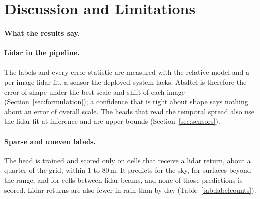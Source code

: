 %
\section{Discussion and Limitations}
\label{sec:discussion}

\paragraph{What the results say.} 

\paragraph{Lidar in the pipeline.} The labels and every error statistic are measured with the relative model and a per-image lidar fit, a sensor the deployed system lacks. AbsRel is therefore the error of shape under the best scale and shift of each image (Section~\ref{sec:formulation}); a confidence that is right about shape says nothing about an error of overall scale. The heads that read the temporal spread also use the lidar fit at inference and are upper bounds (Section~\ref{sec:sensors}).

\paragraph{Sparse and uneven labels.} The head is trained and scored only on cells that receive a lidar return, about a quarter of the grid, within 1 to 80\,m. It predicts for the sky, for surfaces beyond the range, and for cells between lidar beams, and none of those predictions is scored. Lidar returns are also fewer in rain than by day (Table~\ref{tab:labelcounts}). 

